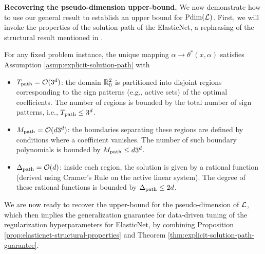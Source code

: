 \textbf{Recovering the pseudo-dimension upper-bound.}
We now demonstrate how to use our general result to establish an upper bound for $\text{\normalfont Pdim}(\mathcal{L})$. First, we will invoke the properties of the solution path of the ElasticNet, a rephrasing of the structural result mentioned in \citet{balcan2023new}.
\begin{proposition} \label{prop:elasticnet-structural-properties}
    For any fixed problem instance, the unique mapping $\alpha \rightarrow \theta^*(x, \alpha)$ satisfies Assumption \ref{asmp:explicit-solution-path} with 
    \begin{itemize}
        \item $T_\textup{path} = \mathcal{O}(3^d)$: the domain $\mathbb{R}^2_{0}$ is partitioned into disjoint regions corresponding to the sign patterns (e.g., active sets) of the optimal coefficients. The number of regions is bounded by the total number of sign patterns, i.e., $T_\textup{path} \leq 3^d$.

        \item $M_\textup{path} = \mathcal{O}(d3^d)$: the boundaries separating these regions are defined by conditions where a coefficient vanishes. The number of such boundary polynomials is bounded by $M_\textup{path} \leq d3^d$.

        \item $\Delta_\textup{path} = \mathcal{O}(d)$: inside each region, the solution is given by a rational function (derived using Cramer's Rule on the active linear system). The degree of these rational functions is bounded by $\Delta_\textup{path} \leq 2d$.  
    \end{itemize}
\end{proposition}

We are now ready to recover the upper-bound for the pseudo-dimension of $\mathcal{L}$, which then implies the generalization guarantee for data-driven tuning of the regularization hyperparameters for ElasticNet, by combining Proposition \ref{prop:elasticnet-structural-properties} and Theorem \ref{thm:explicit-solution-path-guarantee}.

